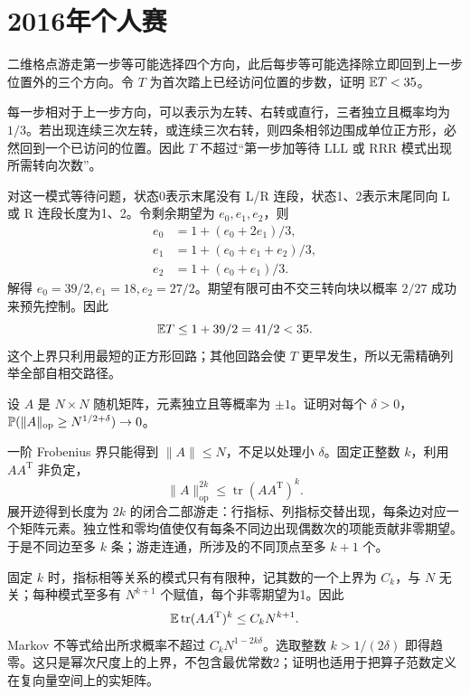 \section{2016年个人赛}
\begin{example}[原题1：不立即回头的格点游走]\label{yau:2016-1}
二维格点游走第一步等可能选择四个方向，此后每步等可能选择除立即回到上一步位置外的三个方向。令 $T$ 为首次踏上已经访问位置的步数，证明 $\mathbb E T<35$。
\end{example}
\begin{solve}
每一步相对于上一步方向，可以表示为左转、右转或直行，三者独立且概率均为 $1/3$。若出现连续三次左转，或连续三次右转，则四条相邻边围成单位正方形，必然回到一个已访问的位置。因此 $T$ 不超过“第一步加等待 LLL 或 RRR 模式出现所需转向次数”。

对这一模式等待问题，状态0表示末尾没有 L/R 连段，状态1、2表示末尾同向 L 或 R 连段长度为1、2。令剩余期望为 $e_0,e_1,e_2$，则
\[
\begin{aligned}
e_0&=1+(e_0+2e_1)/3,\\
e_1&=1+(e_0+e_1+e_2)/3,\\
e_2&=1+(e_0+e_1)/3.
\end{aligned}
\]
解得 $e_0=39/2,e_1=18,e_2=27/2$。期望有限可由不交三转向块以概率 $2/27$ 成功来预先控制。因此
\[
\mathbb E T\le1+39/2=41/2<35.
\]
这个上界只利用最短的正方形回路；其他回路会使 $T$ 更早发生，所以无需精确列举全部自相交路径。
\end{solve}

\begin{example}[原题2：随机符号矩阵的算子范数]\label{yau:2016-2}
设 $A$ 是 $N\times N$ 随机矩阵，元素独立且等概率为 $\pm1$。证明对每个 $\delta>0$，$\mathbb P(\|A\|_{\mathrm{op}}\ge N^{1/2+\delta})\to0$。
\end{example}
\begin{solve}
一阶 Frobenius 界只能得到 $\|A\|\le N$，不足以处理小 $\delta$。固定正整数 $k$，利用 $AA^{\mathrm T}$ 非负定，
\[
\|A\|_{\mathrm{op}}^{2k}\le\operatorname{tr}(AA^{\mathrm T})^k.
\]
展开迹得到长度为 $2k$ 的闭合二部游走：行指标、列指标交替出现，每条边对应一个矩阵元素。独立性和零均值使仅有每条不同边出现偶数次的项能贡献非零期望。于是不同边至多 $k$ 条；游走连通，所涉及的不同顶点至多 $k+1$ 个。

固定 $k$ 时，指标相等关系的模式只有有限种，记其数的一个上界为 $C_k$，与 $N$ 无关；每种模式至多有 $N^{k+1}$ 个赋值，每个非零期望为1。因此
\[
\mathbb E\operatorname{tr}(AA^{\mathrm T})^k\le C_kN^{k+1}.
\]
Markov 不等式给出所求概率不超过 $C_kN^{1-2k\delta}$。选取整数 $k>1/(2\delta)$ 即得趋零。这只是幂次尺度上的上界，不包含最优常数2；证明也适用于把算子范数定义在复向量空间上的实矩阵。
\end{solve}

